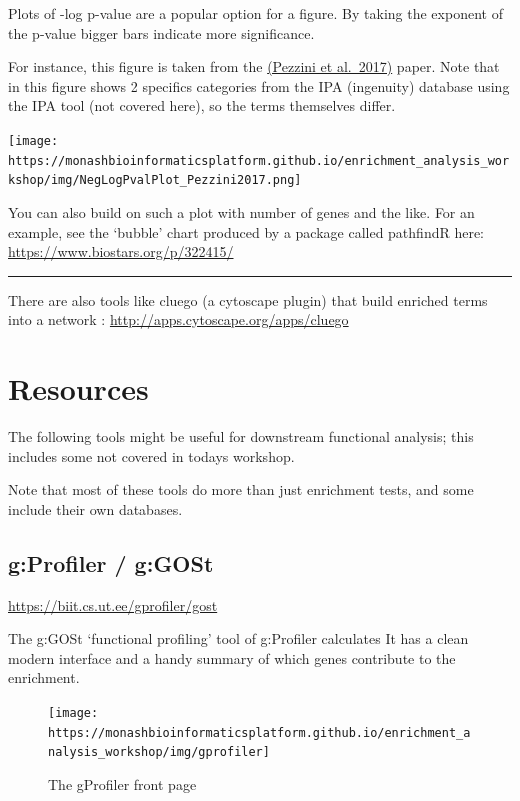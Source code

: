 \documentclass[
]{book}
\begin{document}
Plots of -log p-value are a popular option for a figure. By taking the exponent of the p-value bigger bars indicate more significance.

For instance, this figure is taken from the \href{https://link.springer.com/article/10.1007\%2Fs10571-016-0403-y}{(Pezzini et al.~2017)} paper.
Note that in this figure shows 2 specifics categories from the IPA (ingenuity) database using the IPA tool (not covered here), so the terms themselves differ.

\texttt{[image: https://monashbioinformaticsplatform.github.io/enrichment\_analysis\_workshop/img/NegLogPvalPlot\_Pezzini2017.png]}

You can also build on such a plot with number of genes and the like. For an example, see the `bubble' chart produced by a package called pathfindR here: \url{https://www.biostars.org/p/322415/}

\begin{center}\rule{0.5\linewidth}{0.5pt}\end{center}

There are also tools like cluego (a cytoscape plugin) that build enriched terms into a network : \url{http://apps.cytoscape.org/apps/cluego}

\hypertarget{resources}{%
\chapter{Resources}\label{resources}}

The following tools might be useful for downstream functional analysis; this includes some not covered in todays workshop.

Note that most of these tools do more than just enrichment tests, and some include their own databases.

\hypertarget{gprofiler-ggost}{%
\section{g:Profiler / g:GOSt}\label{gprofiler-ggost}}

\url{https://biit.cs.ut.ee/gprofiler/gost}

The g:GOSt `functional profiling' tool of g:Profiler calculates
It has a clean modern interface and a handy summary of which genes contribute to the enrichment.

\begin{figure}
\texttt{[image: https://monashbioinformaticsplatform.github.io/enrichment\_analysis\_workshop/img/gprofiler]} \caption{The gProfiler front page}\label{fig:unnamed-chunk-37}
\end{figure}
\end{document}
